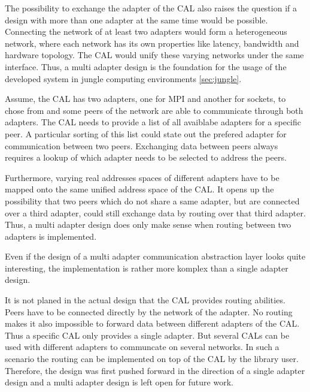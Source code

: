The possibility to exchange the adapter of the CAL also raises the
question if a design with more than one adapter at the same time would
be possible. Connecting the network of at least two adapters would
form a heterogeneous network, where each network has its own
properties like latency, bandwidth and hardware topology. The CAL
would unify these varying networks under the same interface. Thus, a
multi adapter design is the foundation for the usage of the developed
system in jungle computing environments
\ref{sec:jungle}.

Assume, the CAL has two adapters, one for MPI and another for sockets,
to chose from and some peers of the network are able to communicate
through both adapters.  The CAL needs to provide a list of all
avaiblabe adapters for a specific peer. A particular sorting of this
list could state out the prefered adapter for communication between
two peers. Exchanging data between peers always requires a lookup of
which adapter needs to be selected to address the peers.


Furthermore, varying real addresses spaces of different adapters have
to be mapped onto the same unified address space of the CAL.
It opens up the possibility that two peers which do not share a same
adapter, but are connected over a third adapter, could still exchange data
by routing over that third adapter. Thus, a multi adapter design
does only make sense when routing between two adapters is implemented.


Even if the design of a multi adapter communication abstraction layer
looks quite interesting, the implementation is rather more komplex
than a single adapter design. 

It is not planed in the actual design that the CAL provides routing
abilities. Peers have to be connected directly by the network of the
adapter. No routing makes it also impossible to forward data between
different adapters of the CAL. Thus a specific CAL only provides a
single adapter. But several CALs can be used with different adapters
to communcate on several networks. In such a scenario the routing can
be implemented on top of the CAL by the library user. Therefore, the
design was first pushed forward in the direction of a single adapter
design and a multi adapter design is left open for future work.


